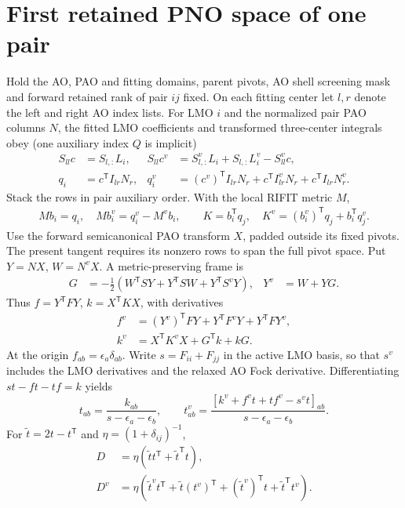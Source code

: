 \documentclass[11pt]{article}
\begin{document}
\section{First retained PNO space of one pair}
Hold the AO, PAO and fitting domains, parent pivots, AO shell screening
mask and forward retained rank of pair $ij$ fixed. On each fitting center
let $l,r$ denote the left and right AO index lists. For LMO $i$ and the
normalized pair PAO columns $N$, the fitted LMO coefficients and transformed
three-center integrals obey (one auxiliary index $Q$ is implicit)
\begin{align}
 S_{ll}c &= S_{l,:}L_i, &
 S_{ll}c^v&=S_{l,:}^vL_i+S_{l,:}L_i^v-S_{ll}^v c,\\
 q_i&=c^{\mathsf T} I_{lr}N_r,&
 q_i^v&=(c^v)^{\mathsf T}I_{lr}N_r+c^{\mathsf T}I_{lr}^vN_r+c^{\mathsf T}I_{lr}N_r^v .
\end{align}
Stack the rows in pair auxiliary order. With the local RIFIT metric $M$,
\begin{align}
 M b_i=q_i,\quad M b_i^v=q_i^v-M^v b_i,\qquad
 K=b_i^{\mathsf T}q_j,\quad K^v=(b_i^v)^{\mathsf T}q_j+b_i^{\mathsf T}q_j^v .
\end{align}
Use the forward semicanonical PAO transform $X$, padded outside its fixed
pivots. The present tangent requires its nonzero rows to span the full pivot
space. Put $Y=NX$, $W=N^vX$. A metric-preserving frame is
\begin{align}
 G&=-\tfrac12(W^{\mathsf T}SY+Y^{\mathsf T}SW+Y^{\mathsf T}S^vY),&
 Y^v&=W+YG .
\end{align}
Thus $f=Y^{\mathsf T}FY$, $k=X^{\mathsf T}KX$, with derivatives
\begin{align}
 f^v&=(Y^v)^{\mathsf T}FY+Y^{\mathsf T}F^vY+Y^{\mathsf T}FY^v,\\
 k^v&=X^{\mathsf T}K^v X+G^{\mathsf T}k+kG .
\end{align}
At the origin $f_{ab}=\epsilon_a\delta_{ab}$. Write $s=F_{ii}+F_{jj}$
in the active LMO basis, so that $s^v$ includes the LMO derivatives and
the relaxed AO Fock derivative. Differentiating $s t-ft-t f=k$ yields
\begin{equation}
 t_{ab}=\frac{k_{ab}}{s-\epsilon_a-\epsilon_b},\qquad
 t^v_{ab}=\frac{[k^v+f^v t+t f^v-s^v t]_{ab}}{s-\epsilon_a-\epsilon_b}.
\end{equation}
For $\tilde t=2t-t^{\mathsf T}$ and $\eta=(1+\delta_{ij})^{-1}$,
\begin{align}
 D&=\eta(\tilde t t^{\mathsf T}+\tilde t^{\mathsf T}t),\\
 D^v&=\eta(\tilde t^v t^{\mathsf T}+\tilde t (t^v)^{\mathsf T}
              +(\tilde t^v)^{\mathsf T}t+\tilde t^{\mathsf T}t^v).
\end{align}
\end{document}
